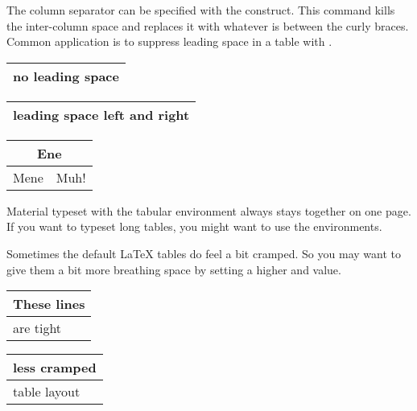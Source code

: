 The column separator can be specified with the 
construct. This command kills the inter-column space and replaces it
with whatever is between the curly braces. 
Common application is to suppress leading space in a table with
.

\begin{example}
\begin{tabular}{@{} l @{}}
\hline
no leading space\\
\hline
\end{tabular}
\end{example}

\begin{example}
\begin{tabular}{l}
\hline
leading space left and right\\
\hline
\end{tabular}
\end{example}

%
%

\begin{example}
\begin{tabular}{|c|c|}
\hline
\multicolumn{2}{|c|}{Ene} \\
\hline
Mene & Muh! \\
\hline
\end{tabular}
\end{example}

Material typeset with the tabular environment always stays together on one
page. If you want to typeset long tables, you might want to use the
 environments.

Sometimes the default \LaTeX{} tables do feel a bit cramped. So you may want
to give them a bit more breathing space by setting a higher
 and  value.

\begin{example}[examplewidth=0.3\linewidth]
\begin{tabular}{|l|}
\hline
These lines\\\hline
are tight\\\hline
\end{tabular}

{
\RenewDocumentCommand{\tabcolsep}{}{0.2cm}
\begin{tabular}{|l|}
\hline
less cramped\\\hline
table layout\\\hline
\end{tabular}}

\end{example}

